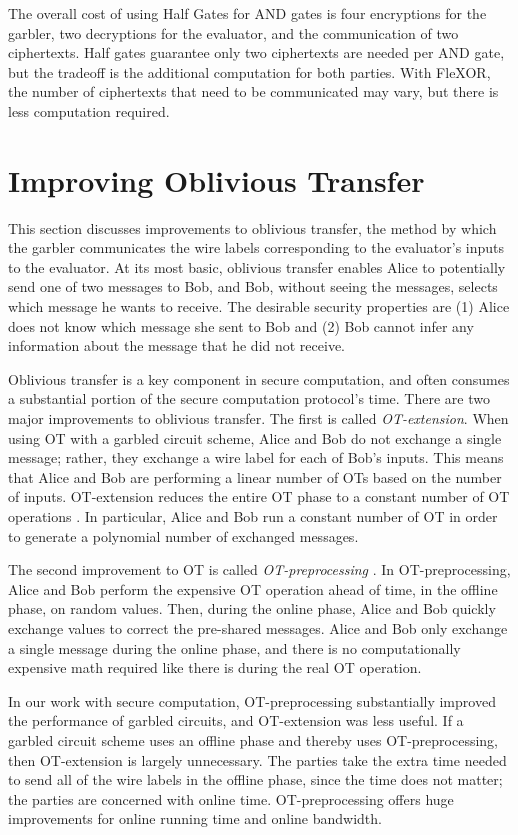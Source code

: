 The overall cost of using Half Gates for AND gates is four encryptions for the garbler, two decryptions for the evaluator, and the communication of two ciphertexts. 
Half gates guarantee only two ciphertexts are needed per AND gate, but the tradeoff is the additional computation for both parties.
With FleXOR, the number of ciphertexts that need to be communicated may vary, but there is less computation required.

\section{Improving Oblivious Transfer}
This section discusses improvements to oblivious transfer, the method by which the garbler communicates the wire labels corresponding to the evaluator's inputs to the evaluator.
At its most basic, oblivious transfer enables Alice to potentially send one of two messages to Bob, and Bob, without seeing the messages, selects which message he wants to receive.
The desirable security properties are (1) Alice does not know which message she sent to Bob and (2) Bob cannot infer any information about the message that he did not receive.

Oblivious transfer is a key component in secure computation, and often consumes a substantial portion of the secure computation protocol's time.
There are two major improvements to oblivious transfer.
The first is called \textit{OT-extension}.
When using OT with a garbled circuit scheme, Alice and Bob do not exchange a single message; rather, they exchange a wire label for each of Bob's inputs.
This means that Alice and Bob are performing a linear number of OTs based on the number of inputs.
OT-extension reduces the entire OT phase to a constant number of OT operations \cite{otextension}.
In particular, Alice and Bob run a constant number of OT in order to generate a polynomial number of exchanged messages.

The second improvement to OT is called \textit{OT-preprocessing} \cite{Bea95}.
In OT-preprocessing, Alice and Bob perform the expensive OT operation ahead of time, in the offline phase, on random values.
Then, during the online phase, Alice and Bob quickly exchange values to correct the pre-shared messages.
Alice and Bob only exchange a single message during the online phase, and there is no computationally expensive math required like there is during the real OT operation.

In our work with secure computation, OT-preprocessing substantially improved the performance of garbled circuits, and OT-extension was less useful.
If a garbled circuit scheme uses an offline phase and thereby uses OT-preprocessing, then OT-extension is largely unnecessary.
The parties take the extra time needed to send all of the wire labels in the offline phase, since the time does not matter; the parties are concerned with online time.
OT-preprocessing offers huge improvements for online running time and online bandwidth.


